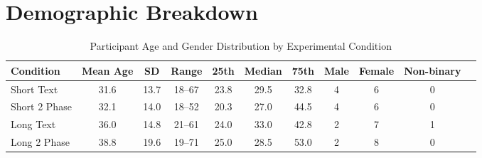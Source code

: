 \section{Demographic Breakdown}
\label{sec:apdx:demo}

\begin{table}[h!]
\centering
\caption{Participant Age and Gender Distribution by Experimental Condition}
\label{tab:age_gender_distribution}
\begin{tabular}{lcccccccccc}
\hline
\textbf{Condition} & \textbf{Mean Age} & \textbf{SD} & \textbf{Range} & \textbf{25th} & \textbf{Median} & \textbf{75th} & \textbf{Male} & \textbf{Female} & \textbf{Non-binary} \\
\hline
Short Text      & 31.6  & 13.7 & 18--67 & 23.8 & 29.5 & 32.8 & 4 & 6 & 0 \\
Short 2 Phase   & 32.1  & 14.0 & 18--52 & 20.3 & 27.0 & 44.5 & 4 & 6 & 0 \\
Long Text       & 36.0  & 14.8 & 21--61 & 24.0 & 33.0 & 42.8 & 2 & 7 & 1 \\
Long 2 Phase    & 38.8  & 19.6 & 19--71 & 25.0 & 28.5 & 53.0 & 2 & 8 & 0 \\
\hline
\end{tabular}
\end{table}
